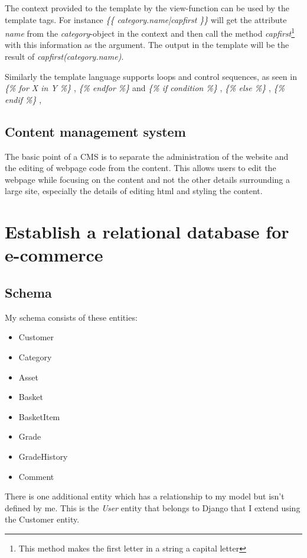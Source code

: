 \documentclass[12pt, a4paper,titlepage]{article}
\begin{document}
The context provided to the template by the view-function can be used by the
template tags. For instance \emph{ \{\{ category.name|capfirst \}\} } will
get the attribute \emph{name} from the \emph{category}-object in the context
and then call the method \emph{capfirst}\footnote{This method makes the
first letter in a string a capital letter} with this information as the
argument. The output in the template will be the result of 
\emph{capfirst(category.name)}.

Similarly the template language supports loops and control sequences, as seen
in \emph{ \{\% for X in Y \%\} }, \emph{ \{\% endfor \%\} } and
\emph{ \{\% if condition \%\} }, \emph{ \{\% else \%\} }, \emph{ \{\% endif \%\} }, 

\subsection{Content management system}
The basic point of a CMS is to separate the administration of the website and
the editing of webpage code from the content. This allows users to edit the
webpage while focusing on the content and not the other details surrounding
a large site, especially the details of editing html and styling the content.


\section{Establish a relational database for e-commerce}
\subsection{Schema}

My schema consists of these entities:
\begin{itemize}
\setlength\itemsep{-7pt}
\item Customer
\item Category
\item Asset
\item Basket
\item BasketItem
\item Grade
\item GradeHistory
\item Comment
\end{itemize}
There is one additional entity which has a relationship to my model but isn't
defined by me. This is the \emph{User} entity that belongs to Django that I
extend using the Customer entity.
\end{document}
